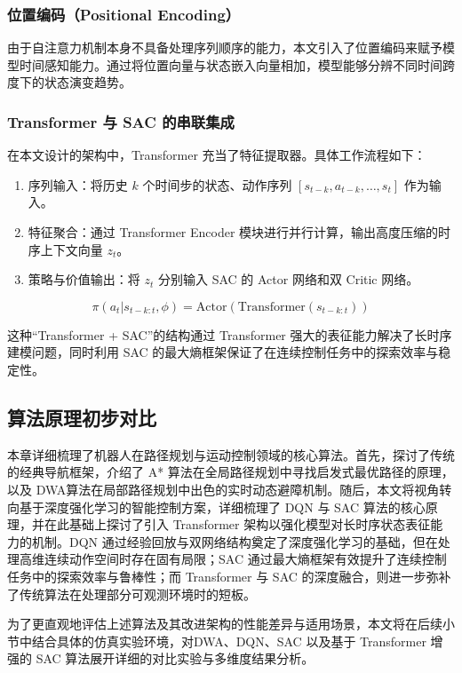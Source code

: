 \documentclass[
  oneside,
  degree=bachelor,
  fullwidthstop=false,
  fontset=fandol,
  times=false,
  minted=true,
  biblatex=true,
]{tongjithesis}
\begin{document}
\subsubsection{位置编码（Positional Encoding）}
由于自注意力机制本身不具备处理序列顺序的能力，本文引入了位置编码来赋予模型时间感知能力。通过将位置向量与状态嵌入向量相加，模型能够分辨不同时间跨度下的状态演变趋势。

\subsubsection{Transformer 与 SAC 的串联集成}
在本文设计的架构中，Transformer 充当了特征提取器。具体工作流程如下：
\begin{enumerate}
    \item 序列输入：将历史 $k$ 个时间步的状态、动作序列 $[s_{t-k}, a_{t-k}, \dots, s_t]$ 作为输入。
    \item 特征聚合：通过 Transformer Encoder 模块进行并行计算，输出高度压缩的时序上下文向量 $z_t$。
    \item 策略与价值输出：将 $z_t$ 分别输入 SAC 的 Actor 网络和双 Critic 网络。
\end{enumerate}

\begin{equation}
    \pi(a_t | s_{t-k:t}, \phi) = \text{Actor}(\text{Transformer}(s_{t-k:t}))
\end{equation}

这种“Transformer + SAC”的结构通过 Transformer 强大的表征能力解决了长时序建模问题，同时利用 SAC 的最大熵框架保证了在连续控制任务中的探索效率与稳定性。

\subsection{算法原理初步对比}
本章详细梳理了机器人在路径规划与运动控制领域的核心算法。首先，探讨了传统的经典导航框架，介绍了 A* 算法在全局路径规划中寻找启发式最优路径的原理，以及 DWA算法在局部路径规划中出色的实时动态避障机制。随后，本文将视角转向基于深度强化学习的智能控制方案，详细梳理了 DQN 与 SAC 算法的核心原理，并在此基础上探讨了引入 Transformer 架构以强化模型对长时序状态表征能力的机制。DQN 通过经验回放与双网络结构奠定了深度强化学习的基础，但在处理高维连续动作空间时存在固有局限；SAC 通过最大熵框架有效提升了连续控制任务中的探索效率与鲁棒性；而 Transformer 与 SAC 的深度融合，则进一步弥补了传统算法在处理部分可观测环境时的短板。

为了更直观地评估上述算法及其改进架构的性能差异与适用场景，本文将在后续小节中结合具体的仿真实验环境，对DWA、DQN、SAC 以及基于 Transformer 增强的 SAC 算法展开详细的对比实验与多维度结果分析。
\end{document}
